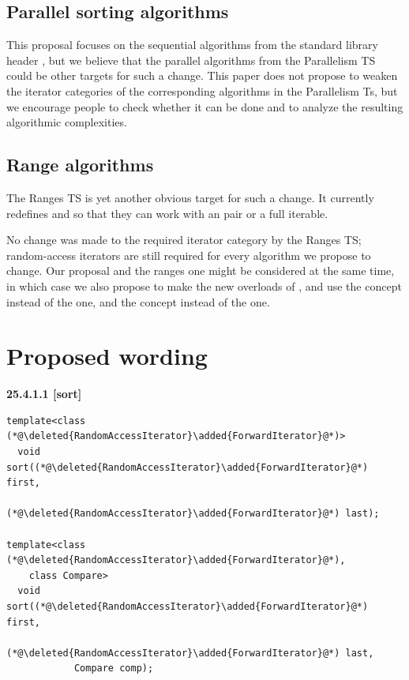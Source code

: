 \documentclass{isocpp_proposal}
\begin{document}
\pagebreak

\subsection{Parallel sorting algorithms}

This proposal focuses on the sequential algorithms from the standard library header , but we believe that the parallel algorithms from the Parallelism TS \cite{N4507} could be other targets for such a change. This paper does not propose to weaken the iterator categories of the corresponding algorithms in the Parallelism Ts, but we encourage people to check whether it can be done and to analyze the resulting algorithmic complexities.

\subsection{Range algorithms}

The Ranges TS \cite{N4560} is yet another obvious target for such a change. It currently redefines  and  so that they can work with an \tcode{[iterator, sentinel)} pair or a full iterable.

\vspace{0.3cm}

No change was made to the required iterator category by the Ranges TS; random-access iterators are still required for every algorithm we propose to change. Our proposal and the ranges one might be considered at the same time, in which case we also propose to make the new overloads of ,  and  use the  concept instead of the  one, and the  concept instead of the  one.

\section{Proposed wording}

\textbf{25.4.1.1  [sort]}

\begin{lstlisting}
template<class (*@\deleted{RandomAccessIterator}\added{ForwardIterator}@*)>
  void sort((*@\deleted{RandomAccessIterator}\added{ForwardIterator}@*) first,
            (*@\deleted{RandomAccessIterator}\added{ForwardIterator}@*) last);

template<class (*@\deleted{RandomAccessIterator}\added{ForwardIterator}@*),
    class Compare>
  void sort((*@\deleted{RandomAccessIterator}\added{ForwardIterator}@*) first,
            (*@\deleted{RandomAccessIterator}\added{ForwardIterator}@*) last,
            Compare comp);
\end{lstlisting}
\end{document}
